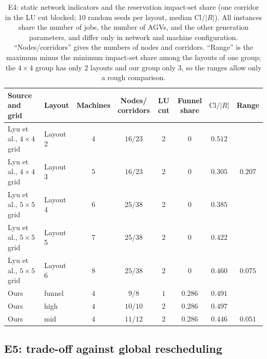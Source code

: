 \documentclass[manuscript,screen,review]{acmart}
\newcommand{\NSeeds}{10}
\newcommand{\PubCloSpread}{0.207}
\newcommand{\PubCloSpreadBig}{0.075}
\newcommand{\SelfCloSpread}{0.051}
\begin{document}
\begin{table}[t]
\centering
\caption{E4: static network indicators and the reservation impact-set share (one corridor in the LU cut blocked; \(\NSeeds\) random seeds per layout, median \(\mathrm{Cl}/|R|\)).
All instances share the number of jobs, the number of AGVs, and the other generation parameters, and differ only in network and machine configuration. ``Nodes/corridors'' gives the numbers of nodes and corridors.
``Range'' is the maximum minus the minimum impact-set share among the layouts of one group; the \(4\times 4\) group has only \(2\) layouts and our group only \(3\),
so the ranges allow only a rough comparison.}
\label{tab:e4pub}
\small
\begin{tabular}{@{}llcccccc@{}}
\toprule
Source and grid & Layout & Machines & \makecell{Nodes/\\corridors} & LU cut & \makecell{Funnel\\share} & \(\mathrm{Cl}/|R|\)
 & Range \\
\midrule
Lyu et al., \(4\times 4\) grid & Layout 2 & \(4\) & \(16/23\) & \(2\) & \(0\) & \(0.512\) & \\
Lyu et al., \(4\times 4\) grid & Layout 3 & \(5\) & \(16/23\) & \(2\) & \(0\) & \(0.305\)
  & \(\PubCloSpread\) \\
\cmidrule{1-8}
Lyu et al., \(5\times 5\) grid & Layout 4 & \(6\) & \(25/38\) & \(2\) & \(0\) & \(0.385\) & \\
Lyu et al., \(5\times 5\) grid & Layout 5 & \(7\) & \(25/38\) & \(2\) & \(0\) & \(0.422\) & \\
Lyu et al., \(5\times 5\) grid & Layout 6 & \(8\) & \(25/38\) & \(2\) & \(0\) & \(0.460\)
  & \(\PubCloSpreadBig\) \\
\midrule
Ours & funnel & \(4\) & \(9/8\) & \(1\) & \(0.286\) & \(0.491\) & \\
Ours & high & \(4\) & \(10/10\) & \(2\) & \(0.286\) & \(0.497\) & \\
Ours & mid & \(4\) & \(11/12\) & \(2\) & \(0.286\) & \(0.446\)
  & \(\SelfCloSpread\) \\
\bottomrule
\end{tabular}
\end{table}

\subsection{E5: trade-off against global rescheduling}
\label{sec:e5}
\end{document}
